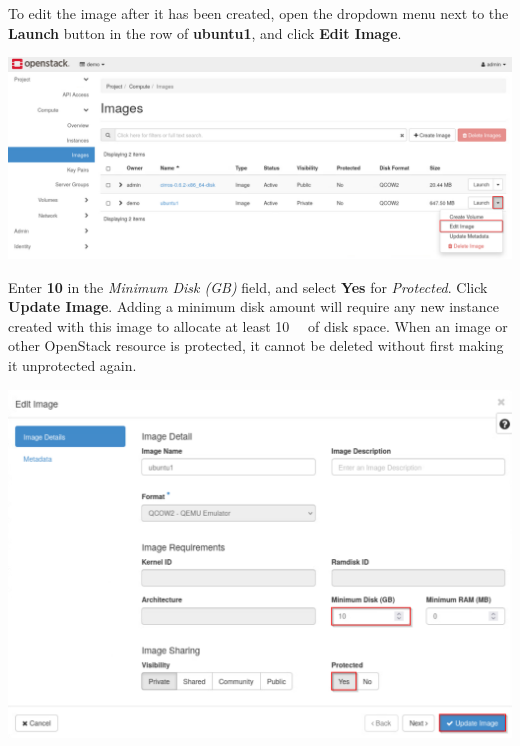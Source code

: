 \documentclass[letterpaper, 12pt]{article}
\begin{document}
\begin{enumerate}
    \begin{labstep}
        To edit the image after it has been created, open the dropdown menu next to the \textbf{Launch} button in the row of \textbf{ubuntu1}, and click \textbf{Edit Image}.

        \begin{center}
            \includegraphics[width=\linewidth]{images/part1/step9.png}
        \end{center}
    \end{labstep}

    \begin{labstep}
        Enter \textbf{10} in the \textit{Minimum Disk (GB)} field, and select \textbf{Yes} for \textit{Protected}.
        Click \textbf{Update Image}.
        Adding a minimum disk amount will require any new instance created with this image to allocate at least \qty{10}{\giga\byte} of disk space.
        When an image or other OpenStack resource is protected, it cannot be deleted without first making it unprotected again.

        \begin{center}
            \includegraphics[width=\linewidth]{images/part1/step10.png}
        \end{center}
    \end{labstep}


\end{enumerate}
\end{document}
